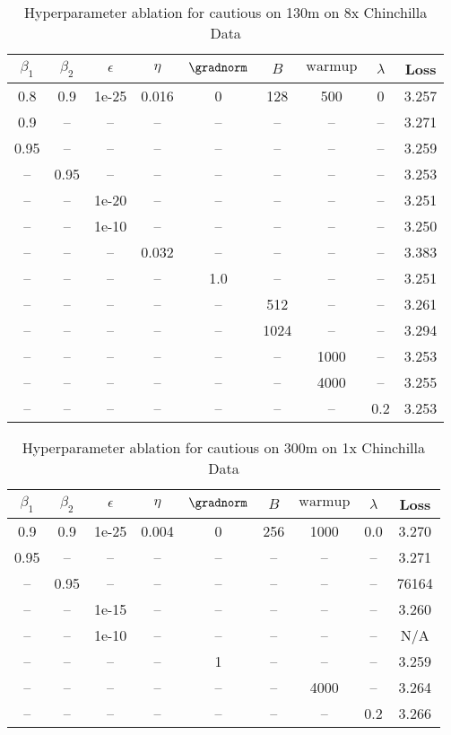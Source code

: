 \begin{table}[h!]
\centering
\caption{Hyperparameter ablation for cautious on 130m on 8x Chinchilla Data}
\label{tab:ablation_cautious_130m_on_8x_chinchilla_data}
\begin{tabular}{ccccccccc}
\toprule
$\beta_1$ & $\beta_2$ & $\epsilon$ & $\eta$ & $\gradnorm$ & $B$ & $\mathrm{warmup}$ & $\lambda$ & Loss \\
\midrule
0.8 & 0.9 & 1e-25 & 0.016 & 0 & 128 & 500 & 0 & 3.257 \\
\midrule
0.9 & -- & -- & -- & -- & -- & -- & -- & 3.271 \\
0.95 & -- & -- & -- & -- & -- & -- & -- & 3.259 \\
-- & 0.95 & -- & -- & -- & -- & -- & -- & 3.253 \\
-- & -- & 1e-20 & -- & -- & -- & -- & -- & 3.251 \\
-- & -- & 1e-10 & -- & -- & -- & -- & -- & 3.250 \\
-- & -- & -- & 0.032 & -- & -- & -- & -- & 3.383 \\
-- & -- & -- & -- & 1.0 & -- & -- & -- & 3.251 \\
-- & -- & -- & -- & -- & 512 & -- & -- & 3.261 \\
-- & -- & -- & -- & -- & 1024 & -- & -- & 3.294 \\
-- & -- & -- & -- & -- & -- & 1000 & -- & 3.253 \\
-- & -- & -- & -- & -- & -- & 4000 & -- & 3.255 \\
-- & -- & -- & -- & -- & -- & -- & 0.2 & 3.253 \\
\bottomrule
\end{tabular}
\end{table}

\begin{table}[h!]
\centering
\caption{Hyperparameter ablation for cautious on 300m on 1x Chinchilla Data}
\label{tab:ablation_cautious_300m_on_1x_chinchilla_data}
\begin{tabular}{ccccccccc}
\toprule
$\beta_1$ & $\beta_2$ & $\epsilon$ & $\eta$ & $\gradnorm$ & $B$ & $\mathrm{warmup}$ & $\lambda$ & Loss \\
\midrule
0.9 & 0.9 & 1e-25 & 0.004 & 0 & 256 & 1000 & 0.0 & 3.270 \\
\midrule
0.95 & -- & -- & -- & -- & -- & -- & -- & 3.271 \\
-- & 0.95 & -- & -- & -- & -- & -- & -- & 76164 \\
-- & -- & 1e-15 & -- & -- & -- & -- & -- & 3.260 \\
-- & -- & 1e-10 & -- & -- & -- & -- & -- & N/A \\
-- & -- & -- & -- & 1 & -- & -- & -- & 3.259 \\
-- & -- & -- & -- & -- & -- & 4000 & -- & 3.264 \\
-- & -- & -- & -- & -- & -- & -- & 0.2 & 3.266 \\
\bottomrule
\end{tabular}
\end{table}

